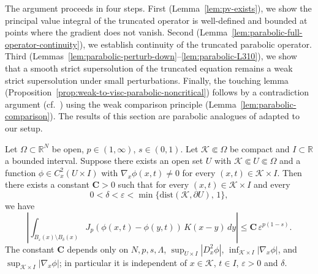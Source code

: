 \documentclass[11pt, a4paper, twoside]{article}
\theoremstyle{definition}
\theoremstyle{remark}
\newcommand{\R}{\mathbb{R}}
\begin{document}
The argument proceeds in four steps. First
(Lemma~\ref{lem:pv-exists}), we show the principal value
integral of the truncated operator is well-defined and
bounded at points where the gradient does not vanish.
Second
(Lemma~\ref{lem:parabolic-full-operator-continuity}), we
establish continuity of the truncated parabolic operator.
Third
(Lemmas~\ref{lem:parabolic-perturb-down}--\ref{lem:parabolic-L310}),
we show that a smooth strict supersolution of the
truncated equation remains a weak strict supersolution
under small perturbations. Finally, the touching
lemma
(Proposition~\ref{prop:weak-to-visc-parabolic-noncritical})
follows by a contradiction argument (cf.~\cite[Proposition 1.5]{BiswasTopp2025}) using the weak
comparison principle
(Lemma~\ref{lem:parabolic-comparison}).
The results of this section are parabolic analogues of \cite{KorvenpaaKuusiLindgren2019} adapted to our setup.

\begin{lemma}\label{lem:pv-exists}
Let $\Omega \subset \R^N$ be open, $p \in (1,\infty)$,
$s \in (0,1)$. Let $\mathcal{K} \Subset \Omega$ be compact
and $I \subset \R$ a bounded interval. Suppose there exists
an open set $U$ with $\mathcal{K} \Subset U \Subset \Omega$
and a function $\phi \in C^2_x(U \times I)$ with
$\nabla_x\phi(x,t) \neq 0$ for every
$(x,t) \in \mathcal{K} \times I$. Then there exists a
constant $\mathbf{C} > 0$ such that for every
$(x,t) \in \mathcal{K} \times I$ and every
\[
  0 < \delta < \varepsilon <
  \min\bigl\{\mathrm{dist}(\mathcal{K},\partial U),\,
  1\bigr\},
\]
we have
\[
  \left| \int_{B_\varepsilon(x) \setminus B_\delta(x)}
  J_p(\phi(x,t)-\phi(y,t))\, K(x-y)\, dy \right|
  \le \mathbf{C}\,\varepsilon^{p(1-s)}.
\]
The constant $\mathbf{C}$ depends only on $N, p, s,
\Lambda$, $\sup_{U \times I}|D_x^2\phi|$,
$\inf_{\mathcal{K} \times I}|\nabla_x\phi|$, and
$\sup_{\mathcal{K} \times I}|\nabla_x\phi|$; in particular
it is independent of $x \in \mathcal{K}$, $t \in I$, $ \varepsilon>0$ and
$\delta$.
\end{lemma}
\end{document}
